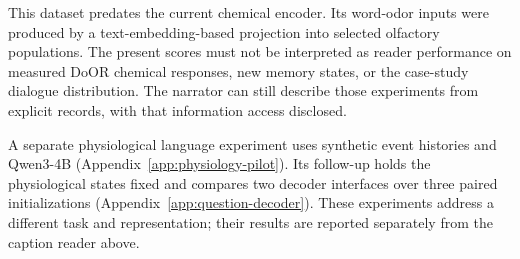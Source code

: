 This dataset predates the current chemical encoder. Its word-odor inputs were produced by a text-embedding-based projection into selected olfactory populations. The present scores must not be interpreted as reader performance on measured DoOR chemical responses, new memory states, or the case-study dialogue distribution. The narrator can still describe those experiments from explicit records, with that information access disclosed.

A separate physiological language experiment uses synthetic event histories and Qwen3-4B (Appendix~\ref{app:physiology-pilot}). Its follow-up holds the physiological states fixed and compares two decoder interfaces over three paired initializations (Appendix~\ref{app:question-decoder}). These experiments address a different task and representation; their results are reported separately from the caption reader above.
